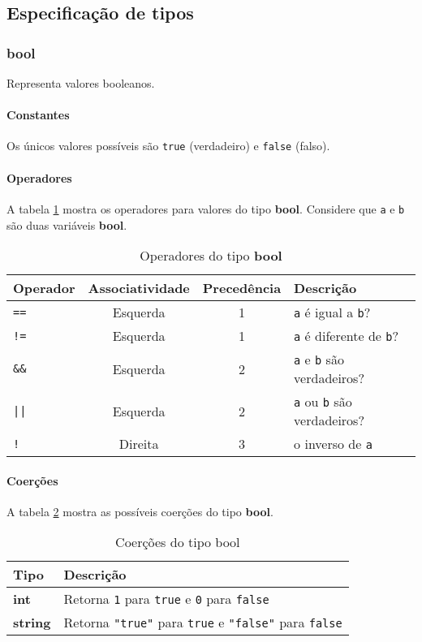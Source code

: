 \subsection{Especificação de tipos}

\subsubsection{bool}
Representa valores booleanos.

\paragraph{Constantes}
Os únicos valores possíveis são \texttt{true} (verdadeiro) e \texttt{false} (falso).

\paragraph{Operadores} A tabela \ref{tab:operadores-bool} mostra os operadores para valores do tipo \textbf{bool}. Considere que \texttt{a} e \texttt{b} são duas variáveis \textbf{bool}.
\begin{table}[!h]
    \centering
    \begin{tabular}{ l c c l }
        Operador      & Associatividade & Precedência & Descrição                \\
        \hline
        \texttt{==}   & Esquerda & 1 & \texttt{a} é igual a \texttt{b}?          \\
        \texttt{!=}   & Esquerda & 1 & \texttt{a} é diferente de \texttt{b}?     \\
        \texttt{\&\&}   & Esquerda & 2 & \texttt{a} e \texttt{b} são verdadeiros?  \\
        \texttt{||}   & Esquerda & 2 & \texttt{a} ou \texttt{b} são verdadeiros? \\
        \texttt{!}    & Direita  & 3 & o inverso de \texttt{a}                   \\
        \hline
    \end{tabular}
    \caption{Operadores do tipo \textbf{bool}}
    \label{tab:operadores-bool}
\end{table}

\paragraph{Coerções} A tabela \ref{tab:coercoes-bool} mostra as possíveis coerções do tipo \textbf{bool}.
\begin{table}[!h]
    \begin{tabular}{@{}ll@{}}
        \toprule
        Tipo            & Descrição                                                                         \\ \midrule
        \textbf{int}    & Retorna \texttt{1} para \texttt{true} e \texttt{0} para \texttt{false}            \\
        \textbf{string} & Retorna \texttt{"true"} para \texttt{true} e \texttt{"false"} para \texttt{false} \\ \bottomrule
    \end{tabular}
    \caption{Coerções do tipo bool}
    \label{tab:coercoes-bool}
\end{table}

